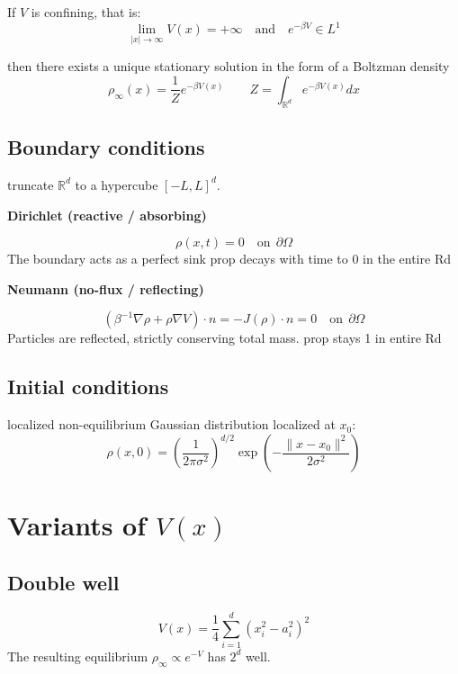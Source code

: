 If $V$ is confining, that is:
$$
\lim_{|x|\to\infty}V(x)=+\infty\quad \text{and} \quad e^{-\beta V}\in L^1
$$

then there exists a unique stationary solution in the form of a Boltzman density
$$
\rho_\infty(x) = \frac{1}{Z} e^{-\beta V(x)} \qquad Z=\int_{\mathbb R^d}e^{-\beta V(x)}dx
$$ 



\subsection{Boundary conditions}
truncate $\mathbb{R}^d$ to a hypercube $[-L,L]^d$.

\textbf{Dirichlet (reactive / absorbing)}

$$
\rho(x,t)=0\quad\text{on}\:\:\partial\Omega
$$
The boundary acts as a perfect sink 
prop decays with time to 0 in the entire Rd\cite{pavliotis}

\textbf{Neumann (no-flux / reflecting)}

$$
(\beta^{-1}\nabla\rho+\rho\nabla V)\cdot n = -J(\rho)\cdot n = 0
\quad\text{on}\:\:\partial\Omega
$$
Particles are reflected, strictly conserving total mass. 
prop stays 1 in entire Rd\cite{pavliotis}

\subsection{Initial conditions}

localized non-equilibrium Gaussian distribution localized at $x_0$:
$$\rho(x, 0) = \left( \frac{1}{2\pi \sigma^2} \right)^{d/2} \exp\left( -\frac{\|x - x_0\|^2}{2\sigma^2} \right)$$


\section{Variants of $V(x)$}


\subsection{Double well}

$$
V(x) = \frac{1}{4}\sum_{i=1}^d (x_i^2-a_i^2)^2
$$
The resulting equilibrium $\rho_\infty\propto e^{-V}$ has $2^d$ well.

